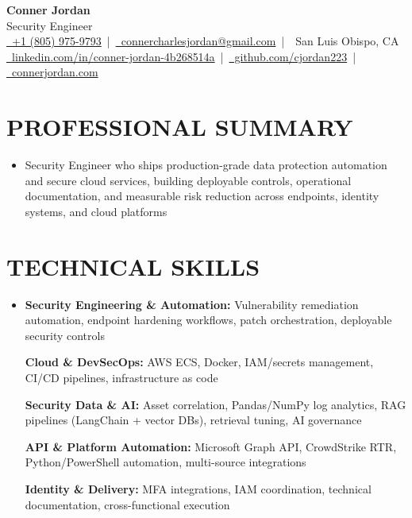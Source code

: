 \documentclass[letterpaper,10pt]{article}
\newcommand{\resumeSubHeadingListStart}{\begin{itemize}[leftmargin=0in,label={}]}
\newcommand{\resumeSubHeadingListEnd}{\end{itemize}}
\begin{document}
\begin{center}
  {\Huge \textbf{Conner Jordan}}\\[0pt]
  {\Large Security Engineer}\\[0pt]
  \href{tel:+18059759793}{\faPhone\ +1 (805) 975-9793} \,|\, 
  \href{mailto:connercharlesjordan@gmail.com}{\faEnvelope\ connercharlesjordan@gmail.com} \,|\, 
  \faMapMarker\ San Luis Obispo, CA \\[-2pt]
  \href{https://www.linkedin.com/in/conner-jordan-4b268514a/}{\faLinkedin\ linkedin.com/in/conner-jordan-4b268514a}
  \,|\, \href{https://github.com/cjordan223}{\faGithub\ github.com/cjordan223}
  \,|\, \href{https://connerjordan.com/}{\faGlobe\ connerjordan.com}
\end{center}

\vspace{4pt}

\section{PROFESSIONAL SUMMARY}
\vspace{8pt}
\resumeSubHeadingListStart
\item {\small
Security Engineer who ships production-grade data protection automation and secure cloud services, building deployable controls, operational documentation, and measurable risk reduction across endpoints, identity systems, and cloud platforms}
\resumeSubHeadingListEnd
\vspace{6pt}

\section{TECHNICAL SKILLS}
\vspace{6pt}
\resumeSubHeadingListStart
\item {\small
\textbf{Security Engineering \& Automation:} Vulnerability remediation automation, endpoint hardening workflows, patch orchestration, deployable security controls

\vspace{3pt}
\textbf{Cloud \& DevSecOps:} AWS ECS, Docker, IAM/secrets management, CI/CD pipelines, infrastructure as code

\vspace{3pt}
\textbf{Security Data \& AI:} Asset correlation, Pandas/NumPy log analytics, RAG pipelines (LangChain + vector DBs), retrieval tuning, AI governance

\vspace{3pt}
\textbf{API \& Platform Automation:} Microsoft Graph API, CrowdStrike RTR, Python/PowerShell automation, multi-source integrations

\vspace{3pt}
\textbf{Identity \& Delivery:} MFA integrations, IAM coordination, technical documentation, cross-functional execution
}
\resumeSubHeadingListEnd
\vspace{6pt}
\end{document}
